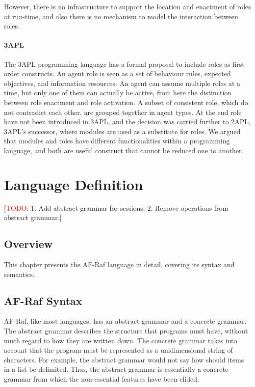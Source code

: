 \documentclass[a4paper,12pt,oneside,fleqn]{book} %
\newcommand{\todo}[1]{[\textcolor{red}{TODO}: #1]}
\begin{document}
However, there is no infrastructure to support the location and enactment
of roles at run-time, and also there is no mechanism to model the
interaction between roles.

\subsubsection{3APL} %
The 3APL programming language\cite{DBLP:conf/aose/DastaniRHDM04} has a
formal proposal to include roles as first order constructs. An agent role
is seen as a set of behaviour rules, expected objectives, and information
resources. An agent can assume multiple roles at a time, but only one of
them can actually be active, from here the distinction between role
enactment and role activation. A subset of consistent role, which do not
contradict each other, are grouped together in agent types. At the end role
have not been introduced in 3APL, and the decision was carried further to
2APL\cite{DBLP:journals/aamas/Dastani08}, 3APL's successor, where modules
are used as a substitute for roles. We argued that modules and roles have
different functionalities within a programming language, and both are
useful construct that cannot be reduced one to another.

\chapter{Language Definition}\label{ch:langdef} %

\todo{1. Add abstract grammar for sessions. 2. Remove operations from
abstract grammar.}

\section{Overview}\label{sec:langdef.overview} %

This chapter presents the AF-Raf language in detail, covering its syntax
and semantics.

\section{AF-Raf Syntax}\label{sec:langdef.syntax} %

AF-Raf, like most languages, has an abstract grammar and a concrete
grammar. The abstract grammar describes the structure that programs must
have, without much regard to how they are written down. The concrete
grammar takes into account that the program must be represented as a
unidimensional string of characters. For example, the abstract grammar
would not say how should items in a list be delimited. Thus, the abstract
grammar is essentially a concrete grammar from which the non-essential
features have been elided.
\end{document}
